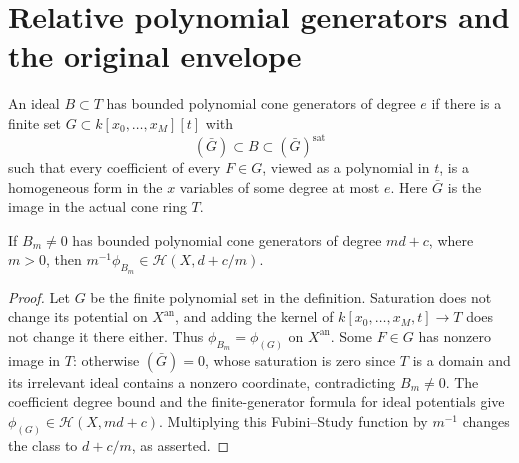 \section{Relative polynomial generators and the original envelope}

\begin{definition}
\label{def:c0n-bounded-polynomial-cone-generators}
\leanok
An ideal $B\subset T$ has bounded polynomial cone generators of degree $e$
if there is a finite set $G\subset k[x_0,\ldots,x_M][t]$ with
\[
 (\bar G)\subset B\subset(\bar G)^{\mathrm{sat}}
\]
such that every coefficient of every $F\in G$, viewed as a polynomial in
$t$, is a homogeneous form in the $x$ variables of some degree at most $e$.
Here $\bar G$ is the image in the actual cone ring $T$.
\end{definition}

\begin{lemma}
\label{lem:c0n-polynomial-cone-fs}
\leanok
If $B_m\ne0$ has bounded polynomial cone generators of degree $md+c$,
where $m>0$, then $m^{-1}\phi_{B_m}\in\mathcal H(X,d+c/m)$.
\end{lemma}
\begin{proof}
Let $G$ be the finite polynomial set in the definition.  Saturation does
not change its potential on $X^{\mathrm{an}}$, and adding the kernel of
$k[x_0,\ldots,x_M,t]\to T$ does not change it there either.  Thus
$\phi_{B_m}=\phi_{(G)}$ on $X^{\mathrm{an}}$.
Some $F\in G$ has nonzero image in $T$: otherwise $(\bar G)=0$, whose
saturation is zero since $T$ is a domain and its irrelevant ideal contains
a nonzero coordinate, contradicting $B_m\ne0$.
The coefficient degree bound and the finite-generator formula for ideal
potentials give $\phi_{(G)}\in\mathcal H(X,md+c)$.
Multiplying this Fubini--Study function by $m^{-1}$ changes the class to
$d+c/m$, as asserted.
\end{proof}

